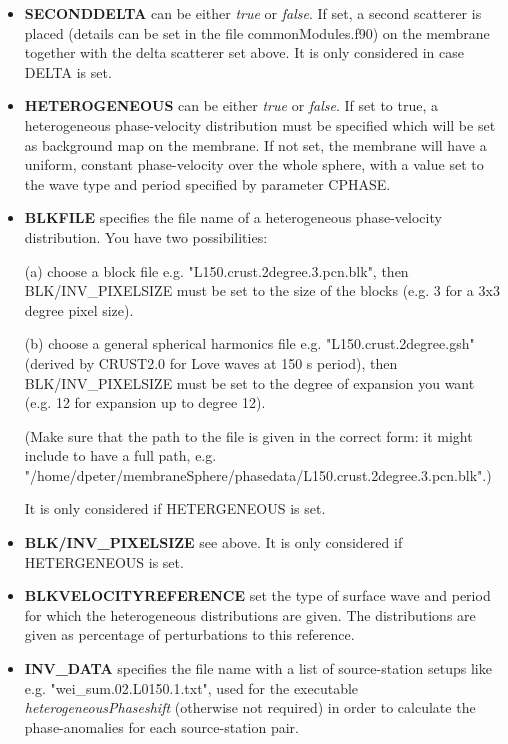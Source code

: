 \documentclass[a4paper,
                          headsepline,
                          listof=totoc,
                          toc=listof,
                          headings=small]{scrreprt} %
\begin{document}
\begin{itemize}
\item \textbf{SECONDDELTA} 
can be either \textit{true} or \textit{false}. If set, a second scatterer is placed (details
can be set in the file commonModules.f90) on the membrane
together with the delta scatterer set above. It is only considered in case DELTA is set.

\item \textbf{HETEROGENEOUS} 
can be either \textit{true} or \textit{false}. If set to true, a heterogeneous phase-velocity distribution must be specified which will be set as background map on the membrane.
If not set, the membrane will have a uniform, constant phase-velocity over the whole sphere, with a value set to the wave type and period specified by parameter CPHASE.

\item \textbf{BLKFILE} 
specifies the file name of a heterogeneous phase-velocity distribution. 
You have two possibilities:

(a) choose a block file e.g. "L150.crust.2degree.3.pcn.blk", then BLK/INV\_PIXELSIZE must be set to the size of the blocks (e.g. 3 for a 3x3 degree pixel size).

(b) choose a general spherical harmonics file e.g. "L150.crust.2degree.gsh" (derived by CRUST2.0 for Love waves at 150 s period), then BLK/INV\_PIXELSIZE must be set to the degree of expansion you want (e.g. 12 for expansion up to degree 12).

(Make sure that the path to the file is given in the correct form: it might include to have a full path, e.g.\\
"/home/dpeter/membraneSphere/phasedata/L150.crust.2degree.3.pcn.blk".)

It is only considered if HETERGENEOUS is set. 

\item \textbf{BLK/INV\_PIXELSIZE} 
see above. It is only considered if HETERGENEOUS is set.

\item \textbf{BLKVELOCITYREFERENCE} 
set the type of surface wave and period for which the heterogeneous distributions
are given. The distributions are given as percentage of perturbations to this reference.

\item \textbf{INV\_DATA} 
specifies the file name with a list of source-station setups 
like e.g. "wei\_sum.02.L0150.1.txt",  
used for the executable \textit{heterogeneousPhaseshift} (otherwise not required)
in order to calculate the phase-anomalies for each source-station pair.


\end{itemize}
\end{document}
